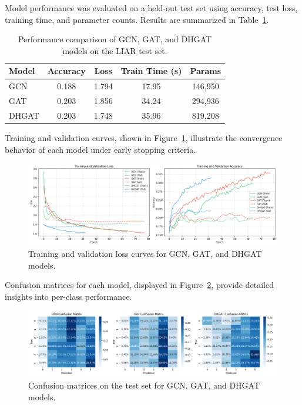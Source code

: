 Model performance was evaluated on a held-out test set using accuracy, test loss, training time, and parameter counts. Results are summarized in Table~\ref{tab:performance_metrics}.

\begin{table}[H]
\centering
\caption{Performance comparison of GCN, GAT, and DHGAT models on the LIAR test set.}
\label{tab:performance_metrics}
\begin{tabular}{lcccc}
\hline
\textbf{Model} & \textbf{Accuracy} & \textbf{Loss} & \textbf{Train Time (s)} & \textbf{Params} \\
\hline
GCN   & 0.188 & 1.794 & 17.95 & 146,950 \\
GAT   & 0.203 & 1.856 & 34.24 & 294,936 \\
DHGAT & 0.203 & 1.748 & 35.96 & 819,208 \\
\hline
\end{tabular}
\end{table}

Training and validation curves, shown in Figure~\ref{fig:training_curves}, illustrate the convergence behavior of each model under early stopping criteria.

\begin{figure}[H]
    \centering
    \includegraphics[width=0.85\linewidth]{sections/figures/training_curves.png}
    \caption{Training and validation loss curves for GCN, GAT, and DHGAT models.}
    \label{fig:training_curves}
\end{figure}

Confusion matrices for each model, displayed in Figure~\ref{fig:confusion_matrices}, provide detailed insights into per-class performance.

\begin{figure}[H]
    \centering
    \includegraphics[width=0.95\linewidth]{sections/figures/confusion_matrices.png}
    \caption{Confusion matrices on the test set for GCN, GAT, and DHGAT models.}
    \label{fig:confusion_matrices}
\end{figure}

